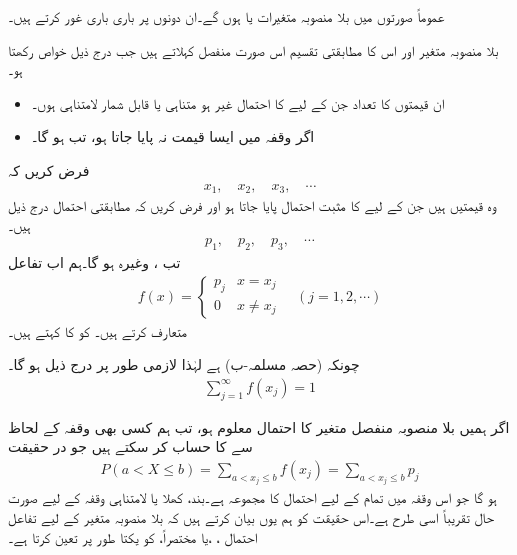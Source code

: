 عموماً صورتوں میں بلا منصوبہ متغیرات  یا  ہوں گے۔ان دونوں پر باری باری غور کرتے ہیں۔

بلا منصوبہ متغیر  اور اس کا مطابقتی تقسیم اس صورت منفصل کہلاتے ہیں جب  درج ذیل خواص رکھتا ہو۔
\begin{itemize}
\item
ان قیمتوں کا تعداد جن کے لیے  کا احتمال غیر  ہو متناہی یا قابل شمار لامتناہی ہوں۔\\
\item
اگر وقفہ  میں ایسا قیمت نہ پایا جاتا ہو، تب  ہو گا۔ 
\end{itemize}

فرض کریں کہ
\begin{align*}
x_1,\quad x_2,\quad x_3,\quad \cdots
\end{align*}
وہ قیمتیں ہیں جن کے لیے  کا مثبت احتمال پایا جاتا ہو اور فرض کریں کہ مطابقتی احتمال درج ذیل ہیں۔
\begin{align*}
p_1,\quad p_2,\quad p_3,\quad \cdots
\end{align*}
تب ، وغیرہ ہو گا۔ہم اب تفاعل
\begin{align}\label{مساوات_شماریات_غیر_مسلسل_متغیر_ب}
f(x)=
\begin{cases}
p_j& x=x_j\\
0&x\ne x_j
\end{cases}\quad
 (j=1,2,\cdots)
\end{align}
متعارف کرتے ہیں۔ کو  کا  کہتے ہیں۔

چونکہ  (حصہ  مسلمہ-ب) ہے لہٰذا لازمی طور پر درج ذیل ہو گا۔
\begin{align}\label{مساوات_شماریات_غیر_مسلسل_متغیر_پ}
\sum_{j=1}^{\infty} f(x_j)=1
\end{align}

اگر ہمیں بلا منصوبہ منفصل متغیر  کا احتمال معلوم ہو، تب ہم کسی بھی وقفہ  کے لحاظ سے   کا حساب کر سکتے ہیں جو در حقیقت
\begin{align}\label{مساوات_شماریات_غیر_مسلسل_متغیر_ت}
P(a<X\le b)=\sum_{a<x_j\le b} f(x_j)=\sum_{a<x_j\le b} p_j
\end{align}
ہو گا جو اس وقفہ میں تمام  کے لیے احتمال  کا مجموعہ ہے۔بند، کھلا یا لامتناہی وقفہ کے لیے صورت حال تقریباً اسی طرح ہے۔اس حقیقت کو ہم یوں بیان کرتے ہیں کہ بلا منصوبہ متغیر  کے لیے  تفاعل احتمال ،  ،یا مختصراً،   کو یکتا طور پر تعین کرتا ہے۔

